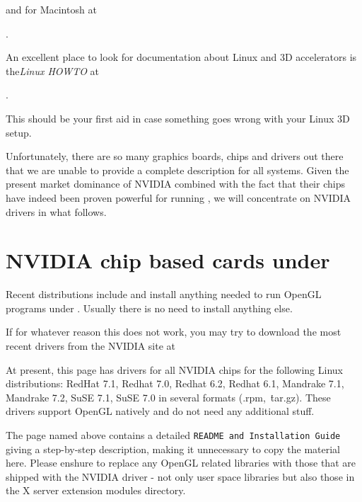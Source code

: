  \noindent
 and for Macintosh at
  \medskip

.
 \medskip

 \noindent
An excellent place to look for documentation about Linux and 3D accelerators is the{\it Linux  HOWTO} at
 \medskip

.
 \medskip

\noindent
 This should be your first aid in case something goes wrong with your Linux 3D setup.

Unfortunately, there are so many graphics boards, chips and drivers out there that we are
unable to provide a complete description for all systems. Given the present market
dominance of NVIDIA combined with the fact that their chips have indeed been proven
powerful for running \FlightGear{}, we will concentrate on NVIDIA
drivers in what follows.

\section{NVIDIA chip based cards under \label{nvidialinux}}
Recent  distributions include and install anything needed to run OpenGL
programs under . Usually there is no need to install anything else.

If for whatever reason this does not work, you may try to download the most recent
drivers from the NVIDIA site at
 \medskip

 \medskip

 \noindent
At present, this page has drivers for all NVIDIA chips for the following Linux
distributions: RedHat 7.1, Redhat 7.0, Redhat 6.2, Redhat
6.1, Mandrake 7.1, Mandrake 7.2, SuSE 7.1, SuSE 7.0 in several formats (.rpm,\ \.tar.gz).
These drivers support OpenGL natively and do not need any additional stuff.

The page named above contains a detailed \texttt{README and Installation Guide} giving a
step-by-step description, making it unnecessary to copy the material here.
Please enshure to replace any OpenGL related libraries with those that are
shipped with the NVIDIA driver - not only user space libraries but also
those in the X server extension modules directory.

